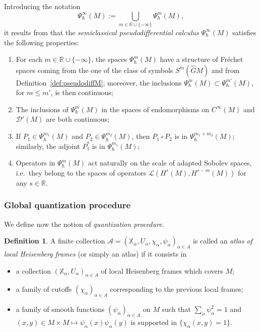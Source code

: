\documentclass[12pt,a4paper]{amsart}
\theoremstyle{plain}
\theoremstyle{definition}
\newtheorem{definition}[theorem]{Definition}
\theoremstyle{remark}
\numberwithin{equation}{section}
\theoremstyle{definition}
\def\R{{\mathbb R}}%
\def \bX{\mathbb{X}}
\def \Ghat{\widehat{G}}
\numberwithin{equation}{section}
\begin{document}
Introducing the notation
\begin{equation*}
    \Psi_\hbar^\infty(M) := \bigcup_{m\in\R\cup\{-\infty\}} \Psi_\hbar^m(M),
\end{equation*}
it results from \cite{FFF24} that the \emph{semiclassical pseudodifferential calculus} $\Psi_\hbar^\infty(M)$ satisfies the following properties:
\begin{enumerate}
    \item[(i)] For each $m\in\R\cup\{-\infty\}$, the spaces $\Psi_\hbar^m(M)$ have a structure of Fréchet spaces coming from the one of the class of symbols $S^m(\Ghat M)$ and from Definition~\ref{def:pseudodiffM}; moreover, the inclusions $\Psi_\hbar^m(M)\subset \Psi_\hbar^{m'}(M)$, for $m\leq m'$, is then continuous;
    \item[(ii)] The inclusions of $\Psi_\hbar^m(M)$ in the spaces of endomorphisms on $C^\infty(M)$ and $\mathcal{D}'(M)$ are both continuous;
    \item[(iii)] If $P_1 \in \Psi_\hbar^{m_1}(M)$ and $P_2 \in \Psi_\hbar^{m_2}(M)$, then $P_1\circ P_2$ is in $\Psi_\hbar^{m_1+m_2}(M)$; similarly, the adjoint $P_1^*$ is in $\Psi_\hbar^{m_1}(M)$;
    \item[(iv)] Operators in $\Psi_\hbar^m(M)$ act naturally on the scale of adapted Sobolev spaces, i.e.~they belong to the spaces of operators $\mathcal{L}(H^s(M),H^{s-m}(M))$ for any $s\in\R$.
\end{enumerate}


\subsubsection{Global quantization procedure}
We define now the notion of \emph{quantization procedure}.

\begin{definition}
    \label{def:atlas}
    A finite collection $\mathcal{A} = (\bX_\alpha,U_\alpha,\chi_\alpha,\psi_\alpha)_{\alpha\in A}$ is called an \emph{atlas of local Heisenberg frames} (or simply an atlas) if it consists in
    \begin{itemize}
        \item[(i)] a collection $(\bX_\alpha,U_\alpha)_{\alpha\in A}$ of local Heisenberg frames which covers $M$;
        \item[(ii)] a family of cutoffs $(\chi_\alpha)_{\alpha\in A}$ corresponding to the previous local frames;
        \item[(iii)] a family of smooth functions $(\psi_\alpha)_{\alpha\in A}$ on $M$ such that $\sum_{\alpha}\psi_{\alpha}^2 = 1$ and $(x,y)\in M\times M\mapsto \psi_\alpha(x)\psi_\alpha(y)$ is supported in $\{\chi_\alpha(x,y)=1\}$.
    \end{itemize}
\end{definition}
\end{document}
